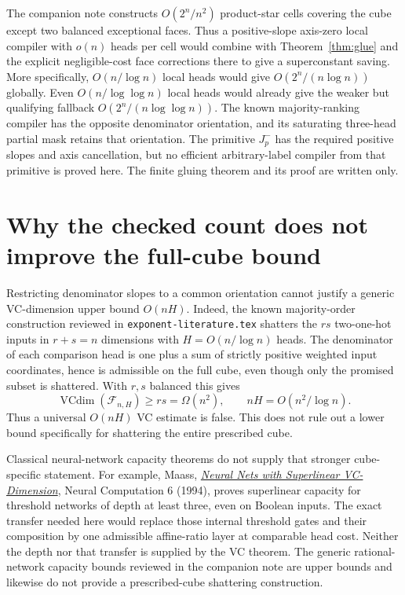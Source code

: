 \documentclass[11pt]{article}
\begin{document}
The companion note constructs $O(2^n/n^2)$ product-star cells covering
the cube except two balanced exceptional faces. Thus a positive-slope
axis-zero local compiler with $o(n)$ heads per cell would combine
with Theorem~\ref{thm:glue} and the explicit negligible-cost face
corrections there to give a superconstant saving. More specifically,
$O(n/\log n)$ local heads would give $O(2^n/(n\log n))$ globally.
Even $O(n/\log\log n)$ local heads would already give the weaker
but qualifying fallback $O(2^n/(n\log\log n))$.
The known majority-ranking compiler has the opposite denominator
orientation, and its saturating three-head partial mask retains that
orientation. The primitive $J^-_p$ has the required positive slopes
and axis cancellation, but no efficient arbitrary-label compiler from
that primitive is proved here. The finite gluing theorem and its
proof are written only.

\section{Why the checked count does not improve the full-cube bound}

Restricting denominator slopes to a common orientation cannot justify
a generic VC-dimension upper bound $O(nH)$. Indeed, the known
majority-order construction reviewed in \texttt{exponent-literature.tex}
shatters the $rs$ two-one-hot inputs in $r+s=n$ dimensions with
$H=O(n/\log n)$ heads. The denominator of each comparison head is
one plus a sum of strictly positive weighted input coordinates, hence
is admissible on the full cube, even though only the promised subset
is shattered. With $r,s$ balanced this gives
\[
 \operatorname{VCdim}(\mathcal F_{n,H})\geq rs=\Omega(n^2),
 \qquad nH=O(n^2/\log n).
\]
Thus a universal $O(nH)$ VC estimate is false. This does not rule out
a lower bound specifically for shattering the entire prescribed cube.

Classical neural-network capacity theorems do not supply that stronger
cube-specific statement. For example, Maass,
\href{https://igi-web.tugraz.at/PDF/66a.pdf}
{\emph{Neural Nets with Superlinear VC-Dimension}},
Neural Computation 6 (1994), proves superlinear capacity for threshold
networks of depth at least three, even on Boolean inputs. The exact
transfer needed here would replace those internal threshold gates
and their composition by one admissible affine-ratio layer at
comparable head cost. Neither the depth nor that transfer is supplied
by the VC theorem. The generic rational-network capacity bounds
reviewed in the companion note are upper bounds and likewise do not
provide a prescribed-cube shattering construction.
\end{document}
